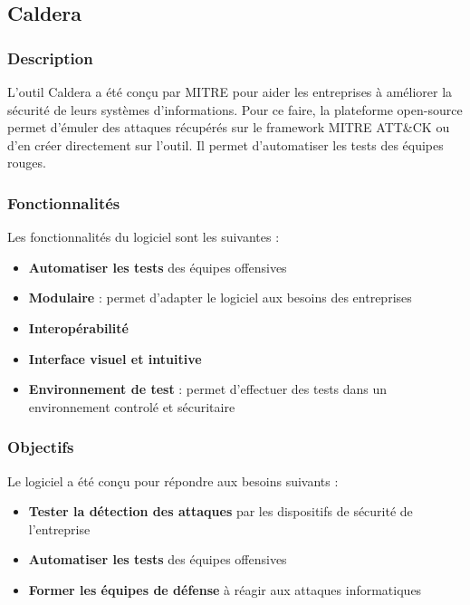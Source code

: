 \documentclass[12pt,letterpaper]{article}
\begin{document}
\subsection{Caldera}

\subsubsection{Description}

L'outil Caldera a été conçu par MITRE pour aider les entreprises à améliorer la sécurité de leurs systèmes d'informations. Pour ce faire, la plateforme open-source permet d'émuler des attaques récupérés sur le framework MITRE ATT\&CK ou d'en créer directement sur l'outil. Il permet d'automatiser les tests des équipes rouges.

\subsubsection{Fonctionnalités}

Les fonctionnalités du logiciel sont les suivantes :
\begin{itemize}
    \item \textbf{Automatiser les tests} des équipes offensives
    \item \textbf{Modulaire} : permet d'adapter le logiciel aux besoins des entreprises
    \item \textbf{Interopérabilité}
    \item \textbf{Interface visuel et intuitive}
    \item \textbf{Environnement de test} : permet d'effectuer des tests dans un environnement controlé et sécuritaire
\end{itemize}

\subsubsection{Objectifs}

Le logiciel a été conçu pour répondre aux besoins suivants :
\begin{itemize}
    \item \textbf{Tester la détection des attaques} par les dispositifs de sécurité de l'entreprise
    \item \textbf{Automatiser les tests} des équipes offensives
    \item \textbf{Former les équipes de défense} à réagir aux attaques informatiques
\end{itemize}
\end{document}
